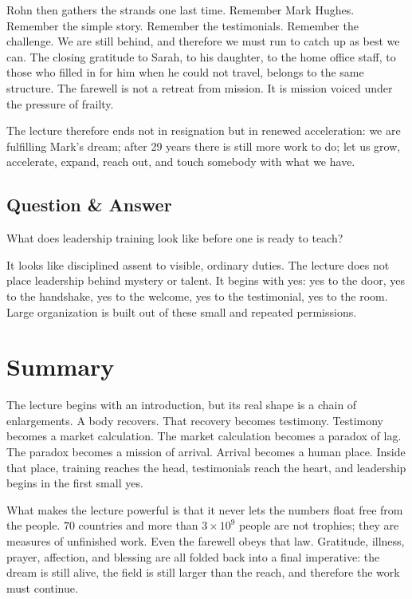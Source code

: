 Rohn then gathers the strands one last time. Remember Mark Hughes. Remember the simple story. Remember the testimonials. Remember the challenge. We are still behind, and therefore we must run to catch up as best we can. The closing gratitude to Sarah, to his daughter, to the home office staff, to those who filled in for him when he could not travel, belongs to the same structure. The farewell is not a retreat from mission. It is mission voiced under the pressure of frailty.

The lecture therefore ends not in resignation but in renewed acceleration: we are fulfilling Mark's dream; after 29 years there is still more work to do; let us grow, accelerate, expand, reach out, and touch somebody with what we have.

\subsection{Question \& Answer}

What does leadership training look like before one is ready to teach?

It looks like disciplined assent to visible, ordinary duties. The lecture does not place leadership behind mystery or talent. It begins with yes: yes to the door, yes to the handshake, yes to the welcome, yes to the testimonial, yes to the room. Large organization is built out of these small and repeated permissions.

\section{Summary}

The lecture begins with an introduction, but its real shape is a chain of enlargements. A body recovers. That recovery becomes testimony. Testimony becomes a market calculation. The market calculation becomes a paradox of lag. The paradox becomes a mission of arrival. Arrival becomes a human place. Inside that place, training reaches the head, testimonials reach the heart, and leadership begins in the first small yes.

What makes the lecture powerful is that it never lets the numbers float free from the people. \(70\) countries and more than \(3\times 10^9\) people are not trophies; they are measures of unfinished work. Even the farewell obeys that law. Gratitude, illness, prayer, affection, and blessing are all folded back into a final imperative: the dream is still alive, the field is still larger than the reach, and therefore the work must continue.